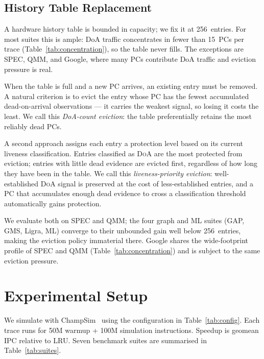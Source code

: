 \documentclass[conference]{IEEEtran}
\newcommand{\lru}{\textsc{LRU}\xspace}
\newcommand{\doa}{\textsc{DoA}\xspace}
\begin{document}
\subsection{History Table Replacement}
\label{sec:histrep}

A hardware history table is bounded in capacity; we fix it at 256~entries.
For most suites this is ample: DoA traffic concentrates in fewer than
15~PCs per trace (Table~\ref{tab:concentration}), so the table never fills.
The exceptions are SPEC, QMM, and Google, where many PCs contribute DoA
traffic and eviction pressure is real.

When the table is full and a new PC arrives, an existing entry must be
removed.
A natural criterion is to evict the entry whose PC has the fewest accumulated
dead-on-arrival observations --- it carries the weakest signal, so losing it
costs the least.
We call this \emph{DoA-count eviction}: the table preferentially retains the
most reliably dead PCs.

A second approach assigns each entry a protection level based on its current
liveness classification.
Entries classified as \doa are the most protected from eviction; entries with
little dead evidence are evicted first, regardless of how long they have been
in the table.
We call this \emph{liveness-priority eviction}: well-established \doa signal
is preserved at the cost of less-established entries, and a PC that
accumulates enough dead evidence to cross a classification threshold
automatically gains protection.

We evaluate both on SPEC and QMM; the four graph and ML suites (GAP, GMS,
Ligra, ML) converge to their unbounded gain well below 256~entries, making
the eviction policy immaterial there. Google shares the wide-footprint
profile of SPEC and QMM (Table~\ref{tab:concentration}) and is subject to
the same eviction pressure.

\section{Experimental Setup}

We simulate with ChampSim~\cite{champsim} using the configuration in
Table~\ref{tab:config}. Each trace runs for 50M warmup + 100M simulation
instructions. Speedup is geomean IPC relative to \lru.
Seven benchmark suites are summarised in Table~\ref{tab:suites}.
\end{document}
